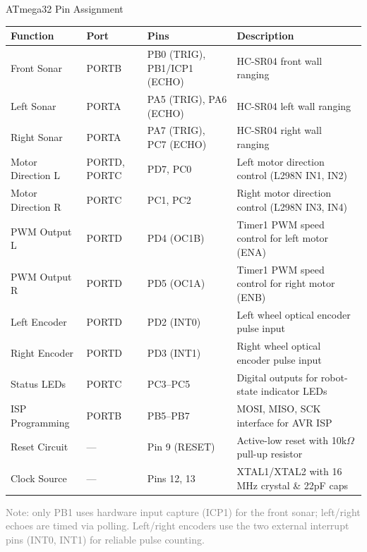 \documentclass[aspectratio=169,11pt]{beamer}
\begin{document}
\begin{frame}{ATmega32 Pin Assignment}
    \begin{table}
        \centering
        \tiny
        \begin{tabular}{@{}lllp{4.6cm}@{}}
            \toprule
            \textbf{Function} & \textbf{Port} & \textbf{Pins} & \textbf{Description} \\
            \midrule
            Front Sonar & PORTB & PB0 (TRIG), PB1/ICP1 (ECHO) & HC-SR04 front wall ranging \\
            Left Sonar & PORTA & PA5 (TRIG), PA6 (ECHO) & HC-SR04 left wall ranging \\
            Right Sonar & PORTA & PA7 (TRIG), PC7 (ECHO) & HC-SR04 right wall ranging \\
            Motor Direction L & PORTD, PORTC & PD7, PC0 & Left motor direction control (L298N IN1, IN2) \\
            Motor Direction R & PORTC & PC1, PC2 & Right motor direction control (L298N IN3, IN4) \\
            PWM Output L & PORTD & PD4 (OC1B) & Timer1 PWM speed control for left motor (ENA) \\
            PWM Output R & PORTD & PD5 (OC1A) & Timer1 PWM speed control for right motor (ENB) \\
            Left Encoder & PORTD & PD2 (INT0) & Left wheel optical encoder pulse input \\
            Right Encoder & PORTD & PD3 (INT1) & Right wheel optical encoder pulse input \\
            Status LEDs & PORTC & PC3--PC5 & Digital outputs for robot-state indicator LEDs \\
            ISP Programming & PORTB & PB5--PB7 & MOSI, MISO, SCK interface for AVR ISP \\
            Reset Circuit & --- & Pin 9 (RESET) & Active-low reset with 10k$\Omega$ pull-up resistor \\
            Clock Source & --- & Pins 12, 13 & XTAL1/XTAL2 with 16 MHz crystal \& 22pF caps \\
            \bottomrule
        \end{tabular}
    \end{table}
    \vspace{0.1cm}
    \scriptsize\textcolor{gray}{Note: only PB1 uses hardware input capture (ICP1) for the front sonar; left/right echoes are timed via polling. Left/right encoders use the two external interrupt pins (INT0, INT1) for reliable pulse counting.}
\end{frame}
\end{document}
